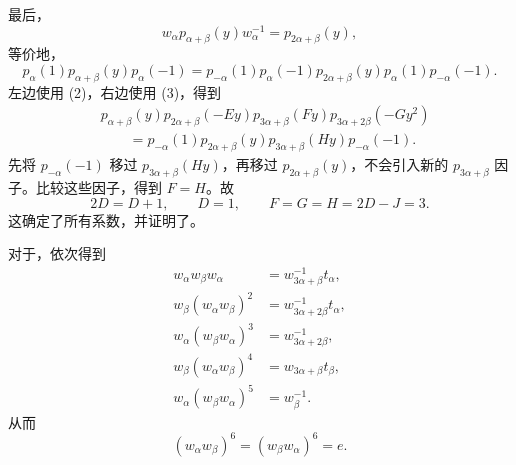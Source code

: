 最后，
\[
  w_\alpha p_{\alpha+\beta}(y)w_\alpha^{-1}=p_{2\alpha+\beta}(y),
\]
等价地，
\[
 p_\alpha(1)p_{\alpha+\beta}(y)p_\alpha(-1)
  =p_{-\alpha}(1)p_\alpha(-1)p_{2\alpha+\beta}(y)
    p_\alpha(1)p_{-\alpha}(-1).
\]
左边使用 (2)，右边使用 (3)，得到
\[
\begin{aligned}
 &p_{\alpha+\beta}(y)p_{2\alpha+\beta}(-Ey)
   p_{3\alpha+\beta}(Fy)p_{3\alpha+2\beta}(-Gy^2)\\
 &\qquad=p_{-\alpha}(1)p_{2\alpha+\beta}(y)
   p_{3\alpha+\beta}(Hy)p_{-\alpha}(-1).
\end{aligned}
\]
先将 \(p_{-\alpha}(-1)\) 移过 \(p_{3\alpha+\beta}(Hy)\)，再移过 \(p_{2\alpha+\beta}(y)\)，不会引入新的 \(p_{3\alpha+\beta}\) 因子。比较这些因子，得到 \(F=H\)。故
\[
  2D=D+1,\qquad D=1,\qquad F=G=H=2D-J=3.
\]
这确定了所有系数，并证明了。

对于，依次得到
\[
\begin{aligned}
 w_\alpha w_\beta w_\alpha
  &=w_{3\alpha+\beta}^{-1}t_\alpha,\\
 w_\beta(w_\alpha w_\beta)^2
  &=w_{3\alpha+2\beta}^{-1}t_\alpha,\\
 w_\alpha(w_\beta w_\alpha)^3
  &=w_{3\alpha+2\beta}^{-1},\\
 w_\beta(w_\alpha w_\beta)^4
  &=w_{3\alpha+\beta}t_\beta,\\
 w_\alpha(w_\beta w_\alpha)^5
  &=w_\beta^{-1}.
\end{aligned}
\]
从而
\[
  (w_\alpha w_\beta)^6=(w_\beta w_\alpha)^6=e.
\]

